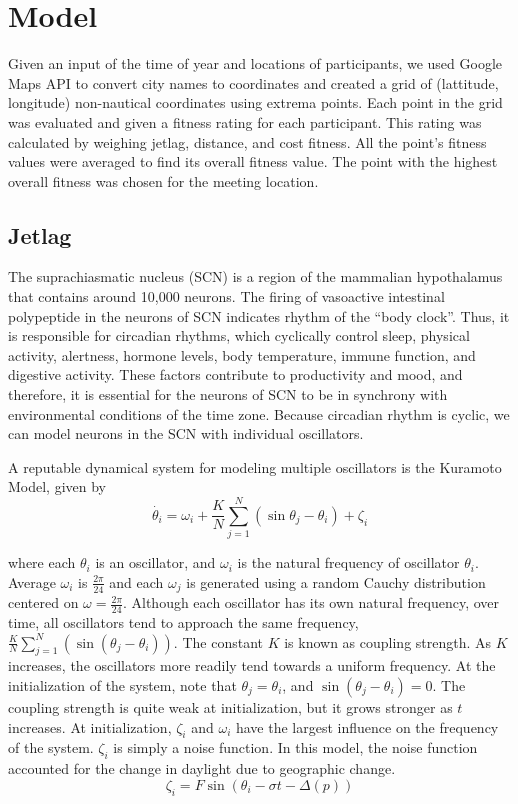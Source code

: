 \section{Model}
Given an input of the time of year and locations of participants, we used Google Maps API to convert city names to coordinates and created a grid of (lattitude, longitude) non-nautical coordinates using extrema points. Each point in the grid was evaluated and given a fitness rating for each participant. This rating was calculated by weighing jetlag, distance, and cost fitness. All the point's fitness values were averaged to find its overall fitness value. The point with the highest overall fitness was chosen for the meeting location.

\subsection{Jetlag}
The suprachiasmatic nucleus (SCN) is a region of the mammalian hypothalamus that contains around 10,000 neurons. The firing of vasoactive intestinal polypeptide in the neurons of SCN indicates rhythm of the ``body clock''. Thus, it is responsible for circadian rhythms, which cyclically control sleep, physical activity, alertness, hormone levels, body temperature, immune function, and digestive activity. These factors contribute to productivity and mood, and therefore, it is essential for the neurons of SCN to be in synchrony with environmental conditions of the time zone. Because circadian rhythm is cyclic, we can model neurons in the SCN with individual oscillators.

A reputable dynamical system for modeling multiple oscillators is the Kuramoto Model, given by
$$\dot{\theta_i} = \omega_i + \frac{K}{N} \sum_{j=1}^ {N}(\sin{\theta_j - \theta_i}) + \zeta_i$$

where each $\theta_i$ is an oscillator, and $\omega_i$ is the natural frequency of oscillator $\theta_i$. Average $\omega_i$ is $\frac{2 \pi}{24}$ and each $\omega_j$ is generated using a random Cauchy distribution centered on $\omega = \frac{2 \pi}{24}$. Although each oscillator has its own natural frequency, over time, all oscillators tend to approach the same frequency, $\frac{K}{N} \sum_{j=1}^N(\sin (\theta_j -\theta_i))$. The constant $K$ is known as coupling strength. As $K$ increases, the oscillators more readily tend towards a uniform frequency. At the initialization of the system, note that $\theta_j = \theta_i$, and $\sin(\theta_j - \theta_i) = 0$. The coupling strength is quite weak at initialization, but it grows stronger as $t$ increases. At initialization, $\zeta_i$ and $\omega_i$ have the largest influence on the frequency of the system. $\zeta_i$ is simply a noise function. In this model, the noise function accounted for the change in daylight due to geographic change. 
$$\zeta_i = F \sin(\theta_i - \sigma t - \Delta(p))$$ 

